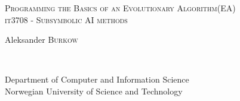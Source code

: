 \begin{titlepage}
  \begin{center}
    \huge
    \noindent\textsc{Programming the Basics of an Evolutionary Algorithm(EA)} \\
    \large
    \noindent\textsc{it3708 - Subsymbolic AI methods} \\ [2cm]
    \large

    \begin{minipage}{0.4\textwidth}
    \centering
      \noindent Aleksander \textsc{Burkow}
    \end{minipage} \\[2cm]


    \vfill

    Department of Computer and Information Science \\
    Norwegian University of Science and Technology \\

  \end{center}
\end{titlepage}
